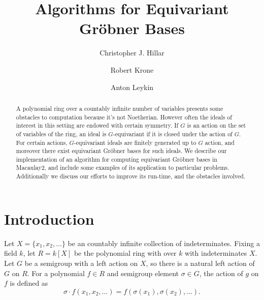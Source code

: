 \documentclass{amsart}
\theoremstyle{definition}
\theoremstyle{remark}
\numberwithin{equation}{section}
\newcommand{\<}{\langle}
\renewcommand{\>}{\rangle}
\begin{document}
 \title[Algorithms for Equivariant Gr\"obner Bases]
{Algorithms for Equivariant Gr\"obner Bases}

\author{Christopher J. Hillar}
\address{Redwood Center for Theoretical Neuroscience, University of California, Berkeley}

\author{Robert Krone}
\address{Georgia Institute of Technology, Atlanta, GA}

\author{Anton Leykin}
\address{Georgia Institute of Technology, Atlanta, GA}


%




\begin{abstract}
 A polynomial ring over a countably infinite number of variables presents some obstacles to computation because it's not Noetherian.  However often the ideals of interest in this setting are endowed with certain symmetry.  If $G$ is an action on the set of variables of the ring, an ideal is $G$-equivariant if it is closed under the action of $G$.  For certain actions, $G$-equivariant ideals are finitely generated up to $G$ action, and moreover there exist equivariant Gr\"obner bases for such ideals. We describe our implementation of an algorithm for computing equivariant Gr\"obner bases in Macaulay2, and include some examples of its application to particular problems.  Additionally we discuss our efforts to improve its run-time, and the obstacles involved.
\end{abstract}

\maketitle

\section{Introduction}
Let $X = \{x_1,x_2,\ldots\}$ be an countably infinite collection of indeterminates.  Fixing a field $k$, let $R = k[X]$ be the polynomial ring with over $k$ with indeterminates $X$.  Let $G$ be a semigroup with a left action on $X$, so there is a natural left action of $G$ on $R$.  For a polynomial $f \in R$ and semigroup element $\sigma \in G$, the action of $g$ on $f$ is defined as
 \[ \sigma\cdot f(x_1,x_2,\ldots) = f(\sigma(x_1),\sigma(x_2),\ldots). \]
\end{document}
